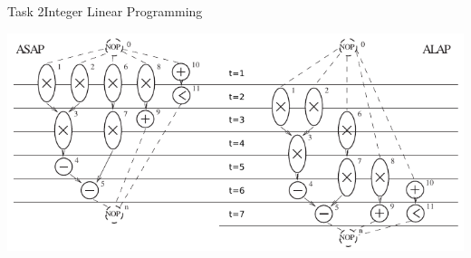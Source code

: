 \begin{frame}[allowframebreaks]{Task 2}{Integer Linear Programming}
\begin{solution}
  \end{solution}
  \begin{solutionnoinc}
    \includegraphics[width=\textwidth]{./figures/task2_scheduling_with_asap_and_alap.png}
  \end{solutionnoinc}
\end{frame}
